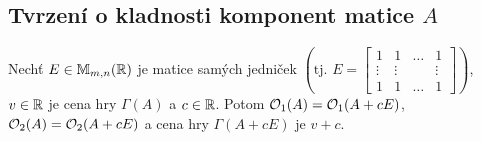 
\subsection{Tvrzení o kladnosti komponent matice \texorpdfstring{$A$}{A}}
Nechť $E \in \mathbb{M}_{m,n} (\mathbb{R})$ je matice samých jedniček $\left(\text{tj. } E = 
\begin{bmatrix}
    1 & 1 & \dots & 1 \\
    \vdots & \vdots &  & \vdots \\
    1 & 1 & \dots & 1
\end{bmatrix}\right)$, $v \in \mathbb{R}$ je cena hry $\Gamma(A)$ a $c \in \mathbb{R}$. 
Potom $\mathcal{O}_1(A) = \mathcal{O}_1(A + cE)$, $\mathcal{O}_2(A) = \mathcal{O}_2(A + cE)$ a cena hry $\Gamma(A+cE)$ je $v+c$.

